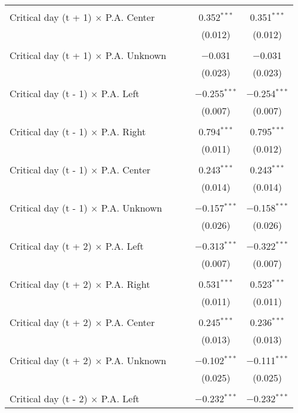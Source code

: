\documentclass[
]{article}
\begin{document}
\begin{table}[!htbp]
{\begin{tabular}{@{\extracolsep{5pt}}lcccc}
  & & & & \\ 
 Critical day (t + 1) $\times$ P.A. Center &  &  & 0.352$^{***}$ & 0.351$^{***}$ \\ 
  &  &  & (0.012) & (0.012) \\ 
  & & & & \\ 
 Critical day (t + 1) $\times$ P.A. Unknown &  &  & $-$0.031 & $-$0.031 \\ 
  &  &  & (0.023) & (0.023) \\ 
  & & & & \\ 
 Critical day (t - 1) $\times$ P.A. Left &  &  & $-$0.255$^{***}$ & $-$0.254$^{***}$ \\ 
  &  &  & (0.007) & (0.007) \\ 
  & & & & \\ 
 Critical day (t - 1) $\times$ P.A. Right &  &  & 0.794$^{***}$ & 0.795$^{***}$ \\ 
  &  &  & (0.011) & (0.012) \\ 
  & & & & \\ 
 Critical day (t - 1) $\times$ P.A. Center &  &  & 0.243$^{***}$ & 0.243$^{***}$ \\ 
  &  &  & (0.014) & (0.014) \\ 
  & & & & \\ 
 Critical day (t - 1) $\times$ P.A. Unknown &  &  & $-$0.157$^{***}$ & $-$0.158$^{***}$ \\ 
  &  &  & (0.026) & (0.026) \\ 
  & & & & \\ 
 Critical day (t + 2) $\times$ P.A. Left &  &  & $-$0.313$^{***}$ & $-$0.322$^{***}$ \\ 
  &  &  & (0.007) & (0.007) \\ 
  & & & & \\ 
 Critical day (t + 2) $\times$ P.A. Right &  &  & 0.531$^{***}$ & 0.523$^{***}$ \\ 
  &  &  & (0.011) & (0.011) \\ 
  & & & & \\ 
 Critical day (t + 2) $\times$ P.A. Center &  &  & 0.245$^{***}$ & 0.236$^{***}$ \\ 
  &  &  & (0.013) & (0.013) \\ 
  & & & & \\ 
 Critical day (t + 2) $\times$ P.A. Unknown &  &  & $-$0.102$^{***}$ & $-$0.111$^{***}$ \\ 
  &  &  & (0.025) & (0.025) \\ 
  & & & & \\ 
 Critical day (t - 2) $\times$ P.A. Left &  &  & $-$0.232$^{***}$ & $-$0.232$^{***}$ \\ 

\end{tabular}}
\end{table}
\end{document}
